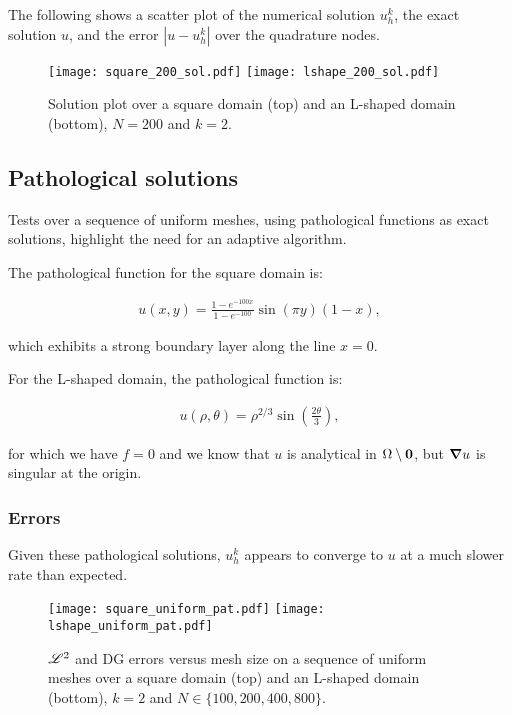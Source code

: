 The following shows a scatter plot of the numerical solution $u^k_h$, the exact solution $u$, and the error $|u - u^k_h|$ over the quadrature nodes.

\begin{figure}[!ht]
	\centering
	\texttt{[image: square\_200\_sol.pdf]}
    \texttt{[image: lshape\_200\_sol.pdf]}
	\caption{Solution plot over a square domain (top) and an L-shaped domain (bottom), $N = 200$ and $k = 2$.}
\end{figure}

\newpage
\subsection{Pathological solutions}

Tests over a sequence of uniform meshes, using pathological functions as exact solutions, highlight the need for an adaptive algorithm.

\cite{Antonietti2013} The pathological function for the square domain is:

\begin{gather} \label{pathological_square}
    u(x, y) = \frac{1 - e^{-100x}}{1 - e^{-100}} \sin(\pi y) (1 - x),
\end{gather}

which exhibits a strong boundary layer along the line $x = 0$.

For the L-shaped domain, the pathological function is:

\begin{gather} \label{pathological_lshape}
    u(\rho, \theta) = \rho^{2 / 3} \sin\left(\frac{2 \theta}{3}\right),
\end{gather}

for which we have $f = 0$ and we know that $u$ is analytical in $\Omega \setminus \bm{0}$, but $\bm{\nabla}{u}$ is singular at the origin.

\newpage
\subsubsection{Errors}

Given these pathological solutions, $u^k_h$ appears to converge to $u$ at a much slower rate than expected.

\begin{figure}[!ht]
	\centering
	\texttt{[image: square\_uniform\_pat.pdf]}
    \texttt{[image: lshape\_uniform\_pat.pdf]}
	\caption{$\mathscr{L}^2$ and DG errors versus mesh size on a sequence of uniform meshes over a square domain (top) and an L-shaped domain (bottom), $k = 2$ and $N \in \{100, 200, 400, 800\}$.}
\end{figure}

